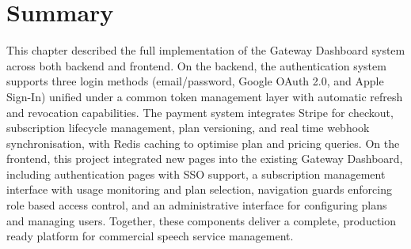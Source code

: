 




\section{Summary}

This chapter described the full implementation of the Gateway Dashboard system across both backend and frontend. On the backend, the authentication system supports three login methods (email/password, Google OAuth 2.0, and Apple Sign-In) unified under a common token management layer with automatic refresh and revocation capabilities. The payment system integrates Stripe for checkout, subscription lifecycle management, plan versioning, and real time webhook synchronisation, with Redis caching to optimise plan and pricing queries. On the frontend, this project integrated new pages into the existing Gateway Dashboard, including authentication pages with SSO support, a subscription management interface with usage monitoring and plan selection, navigation guards enforcing role based access control, and an administrative interface for configuring plans and managing users. Together, these components deliver a complete, production ready platform for commercial speech service management.
